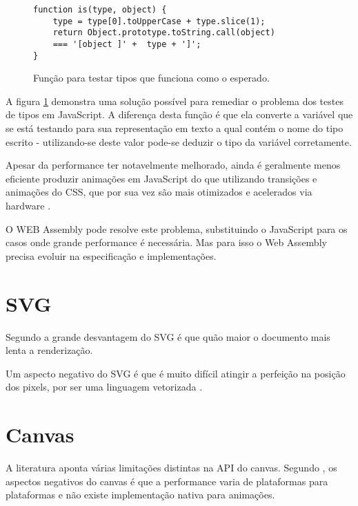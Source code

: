 \begin{figure}
\centering
\begin{verbatim}
function is(type, object) {
    type = type[0].toUpperCase + type.slice(1);
    return Object.prototype.toString.call(object)
    === '[object ]' +  type + ']';
}
\end{verbatim}
\caption{Função para testar tipos que funciona como o esperado.}
\label{fig:fixJSTypes}
\end{figure}

A figura \ref{fig:fixJSTypes} demonstra uma solução possível para
remediar o problema dos testes de tipos em JavaScript. A diferença
desta função é que ela converte a variável que se está testando
para sua representação em texto a qual contém o nome do tipo escrito
- utilizando-se deste valor pode-se deduzir o tipo da variável
corretamente.

Apesar da performance ter notavelmente melhorado, ainda é geralmente
menos eficiente produzir animações em JavaScript do que utilizando
transições e animações do CSS, que por sua vez são mais otimizados
e acelerados via hardware \autocite{html5mostwanted}.

O WEB Assembly pode resolve este problema, substituindo o JavaScript
para os casos onde grande performance é necessária. Mas para isso
o Web Assembly precisa evoluir na especificação e implementações.

\section{SVG}

Segundo \cite{html5mostwanted} a grande desvantagem do SVG é que quão
maior o documento mais lenta a renderização.

Um aspecto negativo do SVG é que é muito difícil atingir a
perfeição na posição dos pixels, por ser uma linguagem vetorizada
\autocite{html5mostwanted}.

\section{Canvas}

A literatura aponta várias limitações distintas na API do canvas.
Segundo \autocite{html5mostwanted}, os aspectos negativos do canvas é
que a performance varia de plataformas para plataformas e não existe
implementação nativa para animações.

